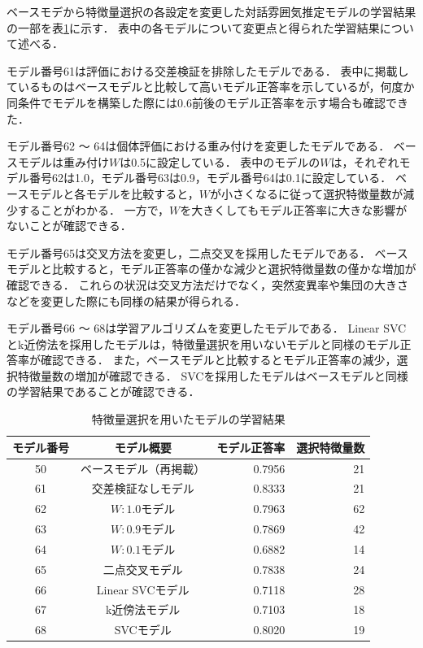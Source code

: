 ベースモデから特徴量選択の各設定を変更した対話雰囲気推定モデルの学習結果の一部を表\ref{tab:learn_result_with_ga_change_params}に示す．
表中の各モデルについて変更点と得られた学習結果について述べる．

モデル番号61は評価における交差検証を排除したモデルである．
表中に掲載しているものはベースモデルと比較して高いモデル正答率を示しているが，何度か同条件でモデルを構築した際には0.6前後のモデル正答率を示す場合も確認できた．

モデル番号62 〜 64は個体評価における重み付けを変更したモデルである．
ベースモデルは重み付け$W$は0.5に設定している．
表中のモデルの$W$は，それぞれモデル番号62は1.0，モデル番号63は0.9，モデル番号64は0.1に設定している．
ベースモデルと各モデルを比較すると，$W$が小さくなるに従って選択特徴量数が減少することがわかる．
一方で，$W$を大きくしてもモデル正答率に大きな影響がないことが確認できる．

モデル番号65は交叉方法を変更し，二点交叉を採用したモデルである．
ベースモデルと比較すると，モデル正答率の僅かな減少と選択特徴量数の僅かな増加が確認できる．
これらの状況は交叉方法だけでなく，突然変異率や集団の大きさなどを変更した際にも同様の結果が得られる．

モデル番号66 〜 68は学習アルゴリズムを変更したモデルである．
Linear SVCとk近傍法を採用したモデルは，特徴量選択を用いないモデルと同様のモデル正答率が確認できる．
また，ベースモデルと比較するとモデル正答率の減少，選択特徴量数の増加が確認できる．
SVCを採用したモデルはベースモデルと同様の学習結果であることが確認できる．

\begin{table}[t]
    \caption{特徴量選択を用いたモデルの学習結果}
    \centering
    \begin{tabular}{|c|c|r|r|}
        \hline
        モデル番号 & モデル概要 & モデル正答率 & 選択特徴量数 \\
        \hline\hline
        50 & ベースモデル（再掲載） & 0.7956 & 21 \\ \hline
        61 & 交差検証なしモデル & 0.8333 & 21 \\ \hline
        62 & $W:1.0$モデル & 0.7963 & 62 \\ \hline
        63 & $W:0.9$モデル & 0.7869 & 42 \\ \hline
        64 & $W:0.1$モデル & 0.6882 & 14 \\ \hline
        65 & 二点交叉モデル & 0.7838 & 24 \\ \hline
        66 & Linear SVCモデル & 0.7118 & 28 \\ \hline
        67 & k近傍法モデル & 0.7103 & 18 \\ \hline
        68 & SVCモデル & 0.8020 & 19 \\ \hline
    \end{tabular}
    \label{tab:learn_result_with_ga_change_params}
\end{table}

